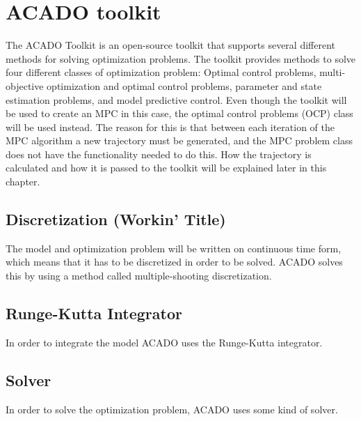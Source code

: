 \section{ACADO toolkit}

The ACADO Toolkit \cite{acadoHOUSKA} is an open-source toolkit that supports several different methods for solving optimization problems. The toolkit provides methods to solve four different classes of optimization problem: Optimal control problems, multi-objective optimization and optimal control problems, parameter and state estimation problems, and model predictive control. Even though the toolkit will be used to create an MPC in this case, the optimal control problems (OCP) class will be used instead. The reason for this is that between each iteration of the MPC algorithm a new trajectory must be generated, and the MPC problem class does not have the functionality needed to do this. How the trajectory is calculated and how it is passed to the toolkit will be explained later in this chapter.



\subsection{Discretization (Workin' Title)}

The model and optimization problem will be written on continuous time form, which means that it has to be discretized in order to be solved. ACADO solves this by using a method called multiple-shooting discretization.


\subsection{Runge-Kutta Integrator}

In order to integrate the model ACADO uses the Runge-Kutta integrator.


\subsection{Solver}

In order to solve the optimization problem, ACADO uses some kind of solver.

